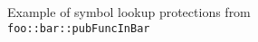 \begin{figure}[h]
{\begin{tikzpicture}
    \end{tikzpicture}
  }
  \caption{\label{fig:(chap5):symbol_privacy} Example of symbol lookup protections from \texttt{foo::bar::pubFuncInBar}}
\end{figure}
